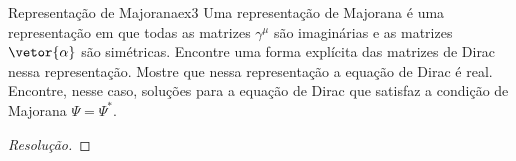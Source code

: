 \begin{exercício}{Representação de Majorana}{ex3}
    Uma representação de Majorana é uma representação em que todas as matrizes \(\gamma^\mu\) são imaginárias e as matrizes \(\vetor{\alpha}\) são simétricas. Encontre uma forma explícita das matrizes de Dirac nessa representação. Mostre que nessa representação a equação de Dirac é real. Encontre, nesse caso, soluções para a equação de Dirac que satisfaz a condição de Majorana \(\Psi = \Psi^*\).
\end{exercício}
\begin{proof}[Resolução]
    
\end{proof}
